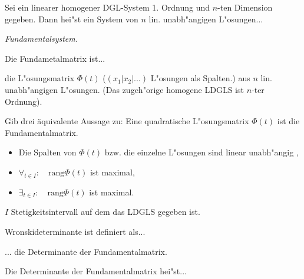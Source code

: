 \documentclass[9pt]{article}
\newenvironment{field}{}{\newpage}
\newif\ifnote
\newenvironment{note}{\notetrue}{\notefalse}
\newcommand{\localtag}{}
\newcommand{\globaltag}{}
\newcommand{\uuid}{}
\newcommand{\tags}[1]{
    \ifnote 
        \renewcommand{\localtag}{#1}
    \else
        \renewcommand{\globaltag}{#1}
    \fi 
    }
\newcommand{\xplain}[1]{\renewcommand{\uuid}{#1}}
\begin{document}
\begin{note}
	\xplain{89e89e04-1b54-4e11-9574-a5a88dca32c1}
	\tags{LDGLS}
	
	\begin{field}  %
		Sei ein linearer homogener DGL-System 1. Ordnung und $n$-ten Dimension gegeben. Dann hei"st ein System von 
		$n$ lin. unabh"angigen L"osungen...
	\end{field}
	
	\begin{field}  %
		\textit{Fundamentalsystem.}
	\end{field}
		
	\begin{field}  %
		Die Fundametalmatrix ist...
	\end{field}
	
	\begin{field}  %
		die L"osungsmatrix $\Phi(t)$ ($(x_1|x_2|...)$ L"osungen als Spalten.) aus $n$ lin. unabh"angigen L"osungen. (Das zugeh"orige homogene LDGLS ist $n$-ter Ordnung).
	\end{field}
		
	\begin{field}  %
		Gib drei äquivalente Aussage zu: Eine quadratische L"osungsmatrix $\Phi(t)$ ist die Fundamentalmatrix.
	\end{field}
	
	\begin{field}  %
		\begin{itemize}
			\item Die Spalten von $\Phi(t)$ bzw. die einzelne L"osungen sind linear unabh"angig ,
			\item $\forall_{t\in I}: \quad \text{rang}\Phi(t)$ ist maximal,
			\item $\exists_{t\in I}: \quad \text{rang}\Phi(t)$ ist maximal.
		\end{itemize}
	$I$ Stetigkeitsintervall auf dem das LDGLS gegeben ist.  
	\end{field}
		
	\begin{field}  %
		Wronskideterminante ist definiert als...
	\end{field}
	
	\begin{field}  %
		... die Determinante der Fundamentalmatrix.
	\end{field}
		
	\begin{field}  %
		Die Determinante der Fundamentalmatrix hei"st...
	\end{field}
	

\end{note}
\end{document}
